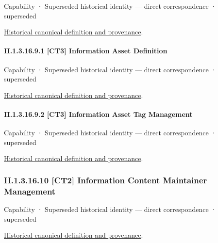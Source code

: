 \label{element:cee085c690314802851de71f4741d8db}
{\small Capability · Superseded historical identity — direct correspondence · superseded}\par
\href{../../../../continuum/strategy/capability/cee085c690314802851de71f4741d8db.md}{Historical canonical definition and provenance}.\par
\paragraph*{II.1.3.16.9.1 [CT3] Information Asset Definition}
\label{navigation:II.1.3.16.9.1}

\label{element:166a22463d2c4534bda7ae31273398b6}
{\small Capability · Superseded historical identity — direct correspondence · superseded}\par
\href{../../../../continuum/strategy/capability/166a22463d2c4534bda7ae31273398b6.md}{Historical canonical definition and provenance}.\par
\paragraph*{II.1.3.16.9.2 [CT3] Information Asset Tag Management}
\label{navigation:II.1.3.16.9.2}

\label{element:ae44a4ee78414d1098814315793bd751}
{\small Capability · Superseded historical identity — direct correspondence · superseded}\par
\href{../../../../continuum/strategy/capability/ae44a4ee78414d1098814315793bd751.md}{Historical canonical definition and provenance}.\par
\subsubsection*{II.1.3.16.10 [CT2] Information Content Maintainer Management}
\label{navigation:II.1.3.16.10}

\label{element:acb977e879204f1491293e5452e0ddf0}
{\small Capability · Superseded historical identity — direct correspondence · superseded}\par
\href{../../../../continuum/strategy/capability/acb977e879204f1491293e5452e0ddf0.md}{Historical canonical definition and provenance}.\par
